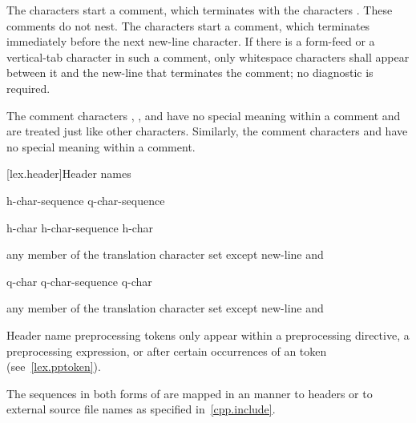 \pnum
{}%
%
%
The characters \tcode{/*} start a comment, which terminates with the
characters \tcode{*/}. These comments do not nest.
%
The characters \tcode{//} start a comment, which terminates immediately before the
next new-line character. If there is a form-feed or a vertical-tab
character in such a comment, only whitespace characters shall appear
between it and the new-line that terminates the comment; no diagnostic
is required.
\begin{note}
The comment characters \tcode{//}, \tcode{/*},
and \tcode{*/} have no special meaning within a \tcode{//} comment and
are treated just like other characters. Similarly, the comment
characters \tcode{//} and \tcode{/*} have no special meaning within a
\tcode{/*} comment.
\end{note}

[lex.header]{Header names}

%
\begin{bnf}
\br
    \terminal{<} h-char-sequence \terminal{>}\br
     q-char-sequence 
\end{bnf}

\begin{bnf}
\br
    h-char\br
    h-char-sequence h-char
\end{bnf}

\begin{bnf}
\br
    \textnormal{any member of the translation character set except new-line and }
\end{bnf}

\begin{bnf}
\br
    q-char\br
    q-char-sequence q-char
\end{bnf}

\begin{bnf}
\br
    \textnormal{any member of the translation character set except new-line and }
\end{bnf}

\pnum
\begin{note}
Header name preprocessing tokens only appear within
a  preprocessing directive,
a  preprocessing expression, or
after certain occurrences of an  token
(see~\ref{lex.pptoken}).
\end{note}
The sequences in both forms of  are mapped in an
 manner to headers or to
external source file names as specified in~\ref{cpp.include}.

